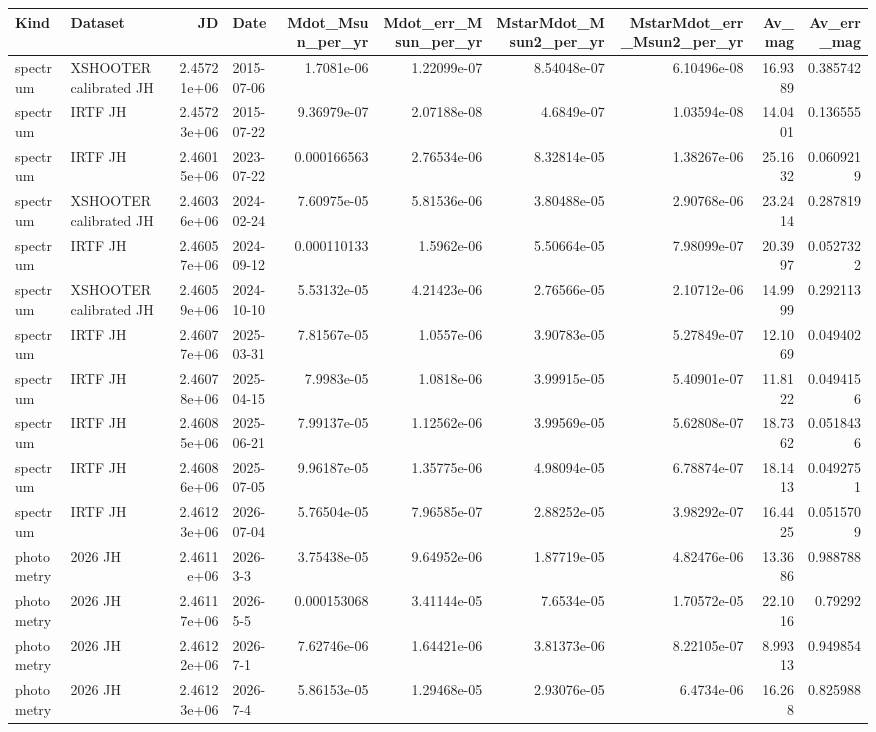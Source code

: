 \begin{tabular}{llrlrrrrrr}
\toprule
Kind & Dataset & JD & Date & Mdot_Msun_per_yr & Mdot_err_Msun_per_yr & MstarMdot_Msun2_per_yr & MstarMdot_err_Msun2_per_yr & Av_mag & Av_err_mag \\
\midrule
spectrum & XSHOOTER calibrated JH & 2.45721e+06 & 2015-07-06 & 1.7081e-06 & 1.22099e-07 & 8.54048e-07 & 6.10496e-08 & 16.9389 & 0.385742 \\
spectrum & IRTF JH & 2.45723e+06 & 2015-07-22 & 9.36979e-07 & 2.07188e-08 & 4.6849e-07 & 1.03594e-08 & 14.0401 & 0.136555 \\
spectrum & IRTF JH & 2.46015e+06 & 2023-07-22 & 0.000166563 & 2.76534e-06 & 8.32814e-05 & 1.38267e-06 & 25.1632 & 0.0609219 \\
spectrum & XSHOOTER calibrated JH & 2.46036e+06 & 2024-02-24 & 7.60975e-05 & 5.81536e-06 & 3.80488e-05 & 2.90768e-06 & 23.2414 & 0.287819 \\
spectrum & IRTF JH & 2.46057e+06 & 2024-09-12 & 0.000110133 & 1.5962e-06 & 5.50664e-05 & 7.98099e-07 & 20.3997 & 0.0527322 \\
spectrum & XSHOOTER calibrated JH & 2.46059e+06 & 2024-10-10 & 5.53132e-05 & 4.21423e-06 & 2.76566e-05 & 2.10712e-06 & 14.9999 & 0.292113 \\
spectrum & IRTF JH & 2.46077e+06 & 2025-03-31 & 7.81567e-05 & 1.0557e-06 & 3.90783e-05 & 5.27849e-07 & 12.1069 & 0.049402 \\
spectrum & IRTF JH & 2.46078e+06 & 2025-04-15 & 7.9983e-05 & 1.0818e-06 & 3.99915e-05 & 5.40901e-07 & 11.8122 & 0.0494156 \\
spectrum & IRTF JH & 2.46085e+06 & 2025-06-21 & 7.99137e-05 & 1.12562e-06 & 3.99569e-05 & 5.62808e-07 & 18.7362 & 0.0518436 \\
spectrum & IRTF JH & 2.46086e+06 & 2025-07-05 & 9.96187e-05 & 1.35775e-06 & 4.98094e-05 & 6.78874e-07 & 18.1413 & 0.0492751 \\
spectrum & IRTF JH & 2.46123e+06 & 2026-07-04 & 5.76504e-05 & 7.96585e-07 & 2.88252e-05 & 3.98292e-07 & 16.4425 & 0.0515709 \\
photometry & 2026 JH & 2.4611e+06 & 2026-3-3 & 3.75438e-05 & 9.64952e-06 & 1.87719e-05 & 4.82476e-06 & 13.3686 & 0.988788 \\
photometry & 2026 JH & 2.46117e+06 & 2026-5-5 & 0.000153068 & 3.41144e-05 & 7.6534e-05 & 1.70572e-05 & 22.1016 & 0.79292 \\
photometry & 2026 JH & 2.46122e+06 & 2026-7-1 & 7.62746e-06 & 1.64421e-06 & 3.81373e-06 & 8.22105e-07 & 8.99313 & 0.949854 \\
photometry & 2026 JH & 2.46123e+06 & 2026-7-4 & 5.86153e-05 & 1.29468e-05 & 2.93076e-05 & 6.4734e-06 & 16.268 & 0.825988 \\
\bottomrule
\end{tabular}
